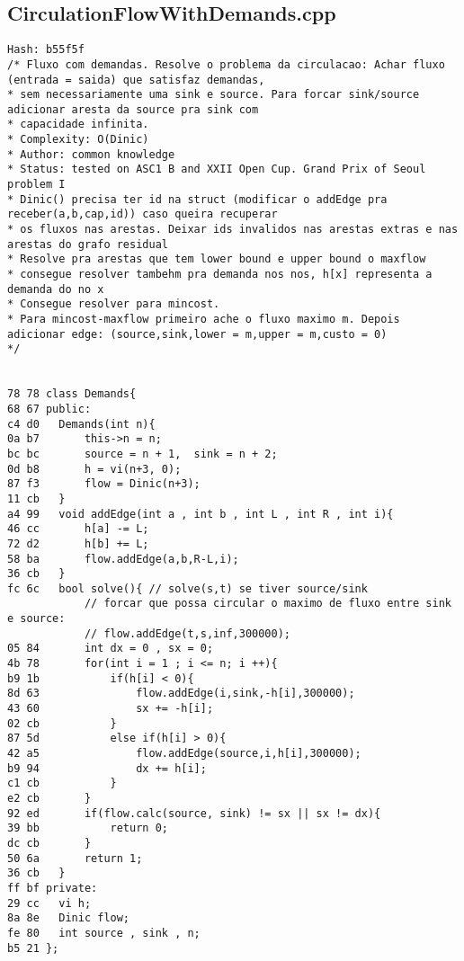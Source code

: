 \documentclass[11pt, a4paper, twoside]{article}
\begin{document}
\subsection{CirculationFlowWithDemands.cpp}
\begin{lstlisting}
Hash: b55f5f
/* Fluxo com demandas. Resolve o problema da circulacao: Achar fluxo (entrada = saida) que satisfaz demandas,
* sem necessariamente uma sink e source. Para forcar sink/source adicionar aresta da source pra sink com
* capacidade infinita.
* Complexity: O(Dinic)
* Author: common knowledge
* Status: tested on ASC1 B and XXII Open Cup. Grand Prix of Seoul problem I
* Dinic() precisa ter id na struct (modificar o addEdge pra receber(a,b,cap,id)) caso queira recuperar
* os fluxos nas arestas. Deixar ids invalidos nas arestas extras e nas arestas do grafo residual
* Resolve pra arestas que tem lower bound e upper bound o maxflow
* consegue resolver tambehm pra demanda nos nos, h[x] representa a demanda do no x
* Consegue resolver para mincost.
* Para mincost-maxflow primeiro ache o fluxo maximo m. Depois adicionar edge: (source,sink,lower = m,upper = m,custo = 0)
*/


78 78 class Demands{
68 67 public:
c4 d0 	Demands(int n){
0a b7 		this->n = n;
bc bc 		source = n + 1,  sink = n + 2;
0d b8 		h = vi(n+3, 0);
87 f3 		flow = Dinic(n+3);
11 cb 	}
a4 99 	void addEdge(int a , int b , int L , int R , int i){
46 cc 		h[a] -= L;
72 d2 		h[b] += L; 
58 ba 		flow.addEdge(a,b,R-L,i);
36 cb 	}
fc 6c 	bool solve(){ // solve(s,t) se tiver source/sink
      		// forcar que possa circular o maximo de fluxo entre sink e source:
      		// flow.addEdge(t,s,inf,300000); 
05 84 		int dx = 0 , sx = 0;
4b 78 		for(int i = 1 ; i <= n; i ++){
b9 1b 			if(h[i] < 0){
8d 63 				flow.addEdge(i,sink,-h[i],300000);
43 60 				sx += -h[i];
02 cb 			}
87 5d 			else if(h[i] > 0){
42 a5 				flow.addEdge(source,i,h[i],300000);
b9 94 				dx += h[i];
c1 cb 			}
e2 cb 		}
92 ed 		if(flow.calc(source, sink) != sx || sx != dx){
39 bb 			return 0;
dc cb 		}
50 6a 		return 1;
36 cb 	}
ff bf private:
29 cc 	vi h;
8a 8e 	Dinic flow;
fe 80 	int source , sink , n;
b5 21 };
\end{lstlisting}
\end{document}
